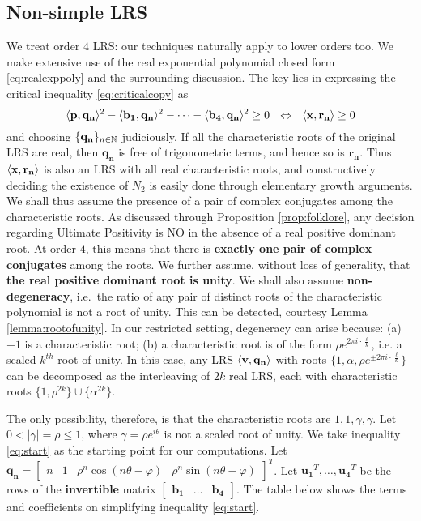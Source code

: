 \subsection{Non-simple LRS}
We treat order $4$ LRS: our techniques naturally apply to lower orders too. We make extensive use of the real exponential polynomial closed form \ref{eq:realexppoly} and the surrounding discussion. The key lies in expressing the critical inequality \ref{eq:criticalcopy} as
\begin{equation}
\label{eq:start}
\langle\mathbf{p}, \mathbf{q_n}\rangle^2 - \langle\mathbf{b_1}, \mathbf{q_n}\rangle^2 - \dots - \langle\mathbf{b_4}, \mathbf{q_n}\rangle^2 \ge 0 ~~\Leftrightarrow~~ \langle\mathbf{x}, \mathbf{r_n}\rangle \ge 0
\end{equation} 
and choosing $\{\mathbf{q_n}\}_{n\in\mathbb{N}}$ judiciously. If all the characteristic roots of the original LRS are real, then $\mathbf{q_n}$ is free of trigonometric terms, and hence so is $\mathbf{r_n}$. Thus $\langle\mathbf{x}, \mathbf{r_n}\rangle$ is also an LRS with all real characteristic roots, and constructively deciding the existence of $N_2$ is easily done through elementary growth arguments. We shall thus assume the presence of a pair of complex conjugates among the characteristic roots. As discussed through Proposition \ref{prop:folklore}, any decision regarding Ultimate Positivity is NO in the absence of a real positive dominant root. At order $4$, this means that there is \textbf{exactly one pair of complex conjugates} among the roots. We further assume, without loss of generality, that \textbf{the real positive dominant root is unity}. We shall also assume \textbf{non-degeneracy}, i.e.\ the ratio of any pair of distinct roots of the characteristic polynomial is not a root of unity. This can be detected, courtesy Lemma \ref{lemma:rootofunity}. In our restricted setting, degeneracy can arise because: (a) $-1$ is a characteristic root; (b) a characteristic root is of the form $\rho e^{2\pi i \cdot \frac{\ell}{k}}$, i.e. a scaled $k^{th}$ root of unity. In this case, any LRS $\langle\mathbf{v}, \mathbf{q_n}\rangle$ with roots $\{1, \alpha, \rho e^{\pm 2\pi i \cdot \frac{\ell}{k}}\}$ can be decomposed as the interleaving of $2k$ real LRS, each with characteristic roots $\{1, \rho^{2k}\} \cup \{\alpha^{2k}\}$.

The only possibility, therefore, is that the characteristic roots are $1, 1, \gamma, \bar{\gamma}$. Let $0 < |\gamma| = \rho \le 1$, where $\gamma = \rho e^{i\theta}$ is not a scaled root of unity. We take inequality \ref{eq:start} as the starting point for our computations. Let $\mathbf{q_n} = \begin{bmatrix} n & 1 & \rho^n\cos(n\theta - \varphi) & \rho^n\sin(n\theta -\varphi) \end{bmatrix}^T$. Let $\mathbf{u_1}^T, \dots, \mathbf{u_4}^T$ be the rows of the \textbf{invertible} matrix $\begin{bmatrix} \mathbf{b_1}& \dots & \mathbf{b_4}\end{bmatrix}$. The table below shows the terms and coefficients on simplifying inequality \ref{eq:start}.

